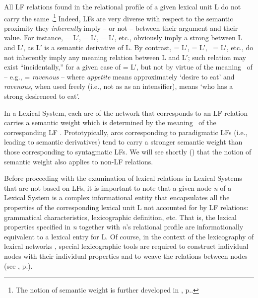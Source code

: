 All LF relations found in the relational profile of a given lexical unit L do not carry the same .\footnote{The notion of semantic weight is further developed in , p.\thinspace\pageref{sec:formalPropertiesLS}.} Indeed, LFs are very diverse with respect to the semantic proximity they \emph{inherently} imply -- or not -- between their argument and their value. For instance,  = L′,  = L′,  = L′, etc., obviously imply a strong  between L and L′, as L′ is a semantic derivative of L. By contrast,  = L′,  = L′, ~= L′, etc., do not inherently imply any meaning relation between L and L′; such relation may exist ``incidentally,'' for a given case of  = L′, but not by virtue of the meaning \sigmaF\ of  -- e.g.,  = \textit{ravenous} -- where \textit{appetite} means approximately `desire to eat' and \textit{ravenous}, when used freely (i.e., not as as an intensifier), means `who has a strong desire\slashs{}need to eat'.

In a Lexical System, each arc of the network that corresponds to an LF relation carries a semantic weight which is determined by the meaning \sigmaF\ of the corresponding LF . Prototypically, arcs corresponding to paradigmatic LFs (i.e., leading to semantic derivatives) tend to carry a stronger semantic weight than those corresponding to syntagmatic LFs. We will see shortly () that the notion of semantic weight also applies to non-LF relations.

Before proceeding with the examination of lexical relations in Lexical Systems that are not based on LFs, it is important to note that a given node \textit{n} of a Lexical System is a complex informational entity that encapsulates all the properties of the corresponding lexical unit L not accounted for by LF relations: grammatical characteristics, lexicographic definition, etc. That is, the lexical properties specified in \textit{n} together with \textit{n}'s relational profile are informationally equivalent to a lexical entry for L. Of course, in the context of the lexicography of lexical networks \parencite{Polguere2014c-e}, special lexicographic tools are required to construct individual nodes with their individual properties and to weave the relations between nodes (see , p.\thinspace\pageref{sec:lexicographyOfLNs}).

